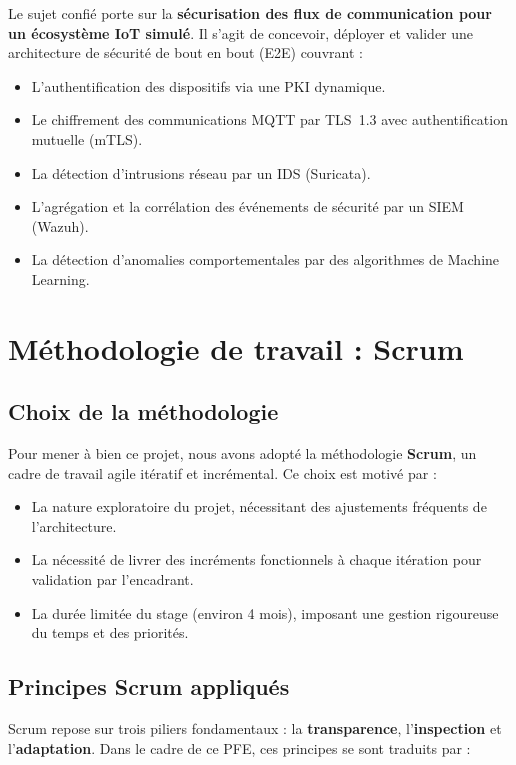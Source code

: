 Le sujet confié porte sur la \textbf{sécurisation des flux de communication pour un écosystème IoT simulé}. Il s'agit de concevoir, déployer et valider une architecture de sécurité de bout en bout (E2E) couvrant :
\begin{itemize}
  \item L'authentification des dispositifs via une PKI dynamique.
  \item Le chiffrement des communications MQTT par TLS~1.3 avec authentification mutuelle (mTLS).
  \item La détection d'intrusions réseau par un IDS (Suricata).
  \item L'agrégation et la corrélation des événements de sécurité par un SIEM (Wazuh).
  \item La détection d'anomalies comportementales par des algorithmes de Machine Learning.
\end{itemize}

\section{Méthodologie de travail : Scrum}

\subsection{Choix de la méthodologie}

Pour mener à bien ce projet, nous avons adopté la méthodologie \textbf{Scrum}, un cadre de travail agile itératif et incrémental. Ce choix est motivé par :
\begin{itemize}
  \item La nature exploratoire du projet, nécessitant des ajustements fréquents de l'architecture.
  \item La nécessité de livrer des incréments fonctionnels à chaque itération pour validation par l'encadrant.
  \item La durée limitée du stage (environ 4 mois), imposant une gestion rigoureuse du temps et des priorités.
\end{itemize}

\subsection{Principes Scrum appliqués}

Scrum repose sur trois piliers fondamentaux : la \textbf{transparence}, l'\textbf{inspection} et l'\textbf{adaptation}. Dans le cadre de ce PFE, ces principes se sont traduits par :


